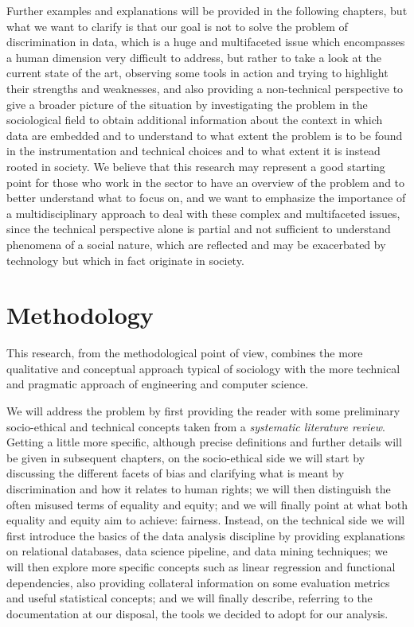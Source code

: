 Further examples and explanations will be provided in the following chapters, but what we want to clarify is that our goal is not to solve the problem of discrimination in data, which is a huge and multifaceted issue which encompasses a human dimension very difficult to address, but rather to take a look at the current state of the art, observing some tools in action and trying to highlight their strengths and weaknesses, and also providing a non-technical perspective to give a broader picture of the situation by investigating the problem in the sociological field to obtain additional information about the context in which data are embedded and to understand to what extent the problem is to be found in the instrumentation and technical choices and to what extent it is instead rooted in society.
We believe that this research may represent a good starting point for those who work in the sector to have an overview of the problem and to better understand what to focus on, and we want to emphasize the importance of a multidisciplinary approach to deal with these complex and multifaceted issues, since the technical perspective alone is partial and not sufficient to understand phenomena of a social nature, which are reflected and may be exacerbated by technology but which in fact originate in society.


\section{Methodology}
This research, from the methodological point of view, combines the more qualitative and conceptual approach typical of sociology with the more technical and pragmatic approach of engineering and computer science.

We will address the problem by first providing the reader with some preliminary socio-ethical and technical concepts taken from a \textit{systematic literature review}. Getting a little more specific, although precise definitions and further details will be given in subsequent chapters, on the socio-ethical side we will start by discussing the different facets of bias and clarifying what is meant by discrimination and how it relates to human rights; we will then distinguish the often misused terms of equality and equity; and we will finally point at what both equality and equity aim to achieve: fairness. Instead, on the technical side we will first introduce the basics of the data analysis discipline by providing explanations on relational databases, data science pipeline, and data mining techniques; we will then explore more specific concepts such as linear regression and functional dependencies, also providing collateral information on some evaluation metrics and useful statistical concepts; and we will finally describe, referring to the documentation at our disposal, the tools we decided to adopt for our analysis.

